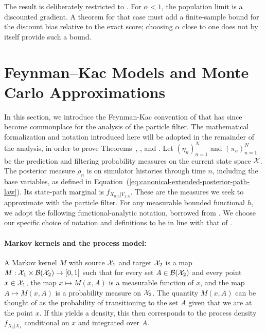 The result is deliberately restricted to .  For $\alpha<1$, the
population limit is a discounted gradient.  A theorem for that case must add a
finite-sample bound for the discount bias relative to the exact score; choosing
$\alpha$ close to one does not by itself provide such a bound.




\section{Feynman--Kac Models and Monte Carlo Approximations}
\label{sec:app07-s3}
\label{appendix:feynman}




In this section, we introduce the Feynman-Kac convention of \cite{delMoral04} that has since become commonplace \citep{karjalainen23} for the analysis of the particle filter.
The mathematical formalization and notation introduced here will be adopted in the remainder of the analysis, in order to prove Theorems~{\thmMopTargeting}, \thmMopGradConsistency, and \thmMopBiasvar.
Let $(\eta_n)_{n=1}^N$ and $(\pi_n)_{n=1}^N$ be the prediction and filtering
probability measures on the current state space ${\mathcal{X}}$. The posterior measure
$\rho_n$ is on simulator histories through time $n$, including the base
variables, as defined in Equation~(\ref{eq:canonical-extended-posterior-path-law}).
Its state-path marginal is $f_{X_{0:n}|Y_{1:n}}$. These are the measures
we seek to approximate with the particle filter.
For any measurable bounded functional $h$, we adopt the following functional-analytic notation, borrowed from \cite{delMoral04, chopin20, karjalainen23}.
We choose our specific choice of notation and definitions to be in line with that of \cite{karjalainen23}. 


\paragraph{\bf Markov kernels and the process model:} A Markov kernel $M$ with source ${\mathcal{X}}_1$ and target ${\mathcal{X}}_2$ is a map $M: {\mathcal{X}}_1 \times \mathcal{B}({\mathcal{X}}_2) \to [0,1]$ such that for every set $A \in \mathcal{B}({\mathcal{X}}_2)$ and every point $x \in {\mathcal{X}}_1$, the map $x \mapsto M(x, A)$ is a measurable function of $x$, and the map $A \mapsto M(x,A)$ is a probability measure on ${\mathcal{X}}_2$. The quantity $M(x,A)$ can be thought of as the probability of transitioning to the set $A$ given that we are at the point $x$. If this yields a density, this then corresponds to the process density $f_{X_{2}|X_1}$ conditional on $x$ and integrated over $A$.  

